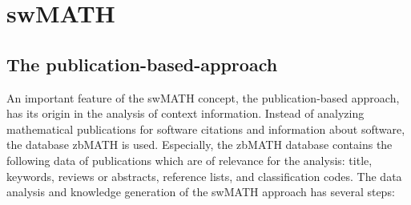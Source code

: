 \documentclass[12pt]{article}
\begin{document}
\section{swMATH}
\subsection{The publication-based-approach}
An important feature of the swMATH \cite{swMATH} concept, the publication-based
approach, has its origin in the analysis of context information. Instead of
analyzing mathematical publications for software citations and information
about software, the database zbMATH \cite{zbMATH} is used.  Especially, the
zbMATH database contains the following data of publications which are of
relevance for the analysis: title, keywords, reviews or abstracts, reference
lists, and classification codes.  The data analysis and knowledge generation of
the swMATH approach has several steps:
\end{document}
